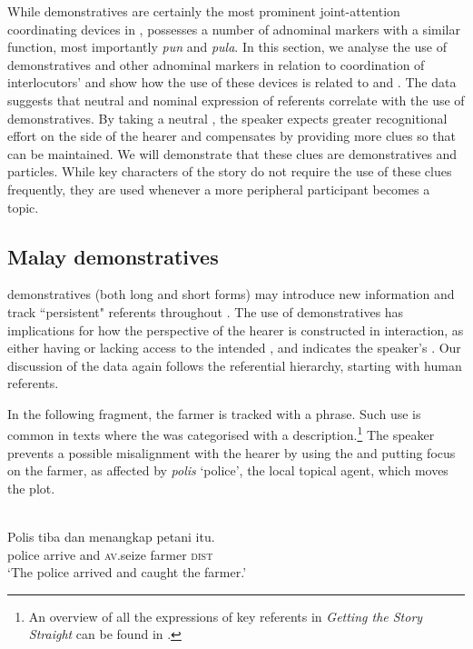 \documentclass[output=paper
,modfonts
,nonflat]{langsci/langscibook}
\begin{document}
While demonstratives are certainly the most prominent joint-attention coordinating devices in  \citep[cf.][]{Himmelmann1996, Williams2009},  possesses a number of adnominal markers with a similar function, most importantly \emph{pun} and \emph{pula}.  In this section, we analyse the use of  demonstratives and other adnominal markers in relation to coordination of interlocutors'  and show how the use of these devices is related to  and  . The data suggests that neutral  and nominal expression of referents correlate with the use of demonstratives. By taking a neutral , the speaker expects greater recognitional effort on the side of the hearer and compensates by providing more clues so that  can be maintained. We will demonstrate that these clues are demonstratives and particles. While key characters of the story do not require the use of these clues frequently, they are used whenever a more peripheral participant becomes a topic. 

\subsection{Malay demonstratives}\label{GivenDem}
 demonstratives (both long and short forms) may introduce new information and track ``persistent" referents throughout  \citep[241]{Himmelmann1996}. The use of demonstratives has implications for how the perspective of the hearer is constructed in interaction, as either having or lacking access to the intended  \citep{Williams2009}, and indicates the speaker's . Our discussion of the data again follows the referential hierarchy, starting with human referents.

In the following fragment, the farmer is tracked with a  phrase. Such use is common in texts where the  was categorised with a description.\footnote{An overview of all the expressions of key referents in \emph{Getting the Story Straight} can be found in .} The speaker prevents a possible misalignment with the hearer by using the  and putting focus on the farmer, as affected by \emph{polis} `police', the local topical agent, which moves the plot.

\ea\label{PolisTibaDan} 
\\
\gll Polis  tiba   dan  menangkap  {\ob}petani itu{\cb}.\\
police arrive and  \textsc{av.}seize     farmer \textsc{dist}\\
\glt `The police arrived and caught the farmer.'
\z
\end{document}
